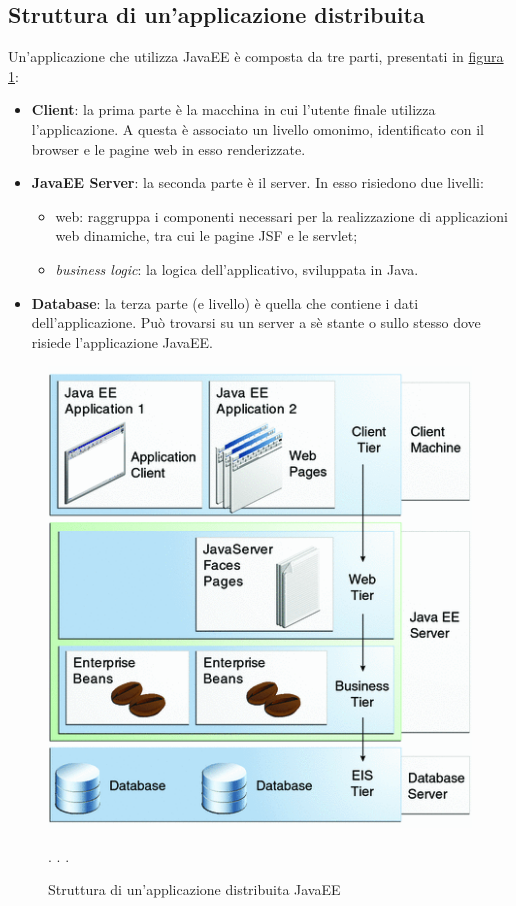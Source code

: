 \subsection{Struttura di un'applicazione distribuita}
Un'applicazione che utilizza JavaEE è composta da tre parti, presentati in \hyperref[fig:javaee-livelli]{figura \ref{fig:javaee-livelli}}:
\begin{itemize}
	\item \textbf{Client}: la prima parte è la macchina in cui l'utente finale utilizza l'applicazione. A questa è associato un livello omonimo, identificato con il browser e le pagine web in esso renderizzate.
	\item \textbf{JavaEE Server}: la seconda parte è il server. In esso risiedono due livelli:
	\begin{itemize}
		\item web: raggruppa i componenti necessari per la realizzazione di applicazioni web dinamiche, tra cui le pagine JSF e le servlet;
		\item \textit{business logic}: la logica dell'applicativo, sviluppata in Java.
	\end{itemize}
	\item \textbf{Database}: la terza parte (e livello) è quella che contiene i dati dell'applicazione. Può trovarsi su un server a sè stante o sullo stesso dove risiede l'applicazione JavaEE.
\end{itemize}
\begin{figure}
	\centering
	\includegraphics{Immagini/javaee-struttura.png}
	\caption{Struttura di un'applicazione distribuita JavaEE}
	\label{fig:javaee-livelli}
	\footnotesize{}. \citeauthor{bib:javaee-tutorial}. \citeyear{bib:javaee-tutorial}.
\end{figure}

